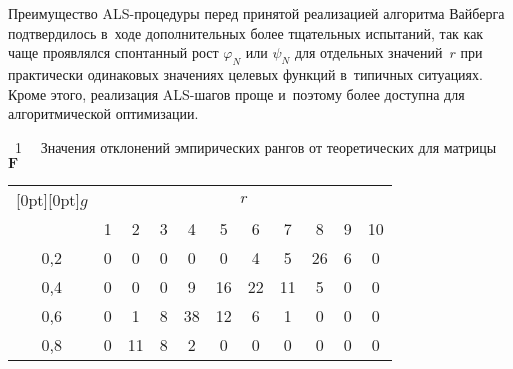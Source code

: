 \begin{multicols}{2}
 \begin{figure*}[b] %
\vspace*{1pt}
\begin{minipage}[t]{80mm}
  \begin{center}  
    \mbox{%
\epsfxsize=77.742mm
}
\end{center}
\vspace*{-6pt}
\end{minipage}
\hfill
\vspace*{1pt}
     \begin{minipage}[t]{80mm}
       \begin{center}  
    \mbox{%
\epsfxsize=78mm
}
\end{center}
\vspace*{-6pt}
\end{minipage}
\end{figure*}

     
     Преимущество ALS-про\-це\-ду\-ры перед принятой реализацией 
алгоритма Вайберга подтвердилось в~ходе дополнительных более тщательных 
испытаний, так как чаще проявлялся спонтанный рост $\varphi_N$ или $\psi_N$ 
для отдельных значений~$r$ при практически одинаковых значениях целевых 
функций в~типичных ситуациях. Кроме этого, реализация ALS-ша\-гов проще и~поэтому более доступна для алгоритмической оптимизации.

\begin{center}  %
\vspace*{-3pt}
\noindent
\parbox{79mm}{{\tablename~1}\ \ \small{
Значения отклонений эмпирических рангов от теоретических для 
матрицы~$\mathbf{F}$ 
}}

\vspace*{6pt}

{\small %
\tabcolsep=4.9pt
\begin{tabular}{|c|c|c|c|c|c|c|c|c|c|c|}
\hline
\raisebox{-6pt}[0pt][0pt]{$g$}&\multicolumn{10}{c|}{$r$}\\
\cline{2-11}
&1&2&3&4&5&6&7&8&9&10\hphantom{9}\\
\hline
0,2&0&0&0&0&0&4&5&26\hphantom{9}&6&0\\
0,4&0&0&0&9&16\hphantom{9}&22\hphantom{9}&11&5&0&0\\
0,6&0&1&8&38\hphantom{9}&12\hphantom{9}&6&1&0&0&0\\
0,8&0&11\hphantom{9}&8&2&0&0&0&0&0&0\\
\hline
\end{tabular}
}
\end{center}




\end{multicols}
